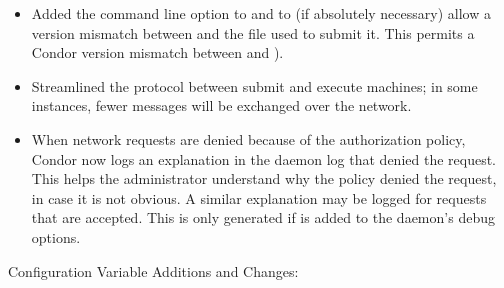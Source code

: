 \begin{itemize}
\item Added the  command line option to
 and  to (if absolutely necessary)
allow a version mismatch between  and the
 file used to submit it.
This permits a Condor version mismatch between
 and ).

\item Streamlined the protocol between submit and execute machines; in some
instances, fewer messages will be exchanged over the network.

\item When network requests are denied because of the authorization
policy, Condor now logs an explanation in the daemon log that denied
the request.  This helps the administrator understand why the policy
denied the request, in case it is not obvious.  A similar explanation
may be logged for requests that are accepted.  This is only generated
if  is added to the daemon's debug options.

\end{itemize}

\noindent Configuration Variable Additions and Changes:

